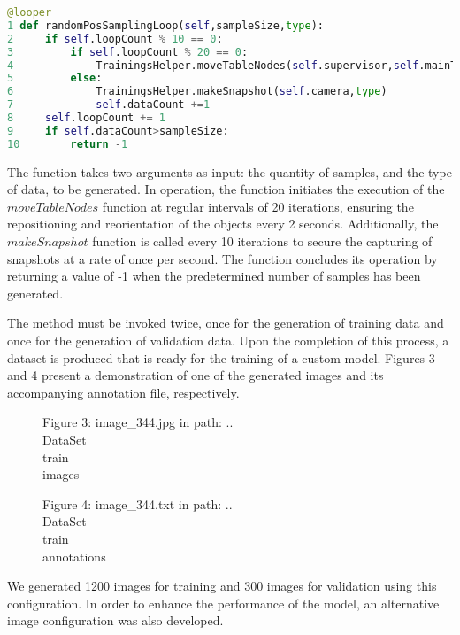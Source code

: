 \begin{lstlisting}[language=python]
@looper
1 def randomPosSamplingLoop(self,sampleSize,type):
2     if self.loopCount % 10 == 0:
3         if self.loopCount % 20 == 0:
4             TrainingsHelper.moveTableNodes(self.supervisor,self.mainTable)
5         else:
6             TrainingsHelper.makeSnapshot(self.camera,type)
7             self.dataCount +=1
8     self.loopCount += 1
9     if self.dataCount>sampleSize:
10        return -1
\end{lstlisting}
The function takes two arguments as input: the quantity of samples, and the type of data, to be generated. In operation, the function initiates the execution of the \(moveTableNodes\) function at regular intervals of 20 iterations, ensuring the repositioning and reorientation of the objects every 2 seconds. Additionally, the \(makeSnapshot\) function is called every 10 iterations to secure the capturing of snapshots at a rate of once per second. The function concludes its operation by returning a value of -1 when the predetermined number of samples has been generated.

The method must be invoked twice, once for the generation of training data and once for the generation of validation data. Upon the completion of this process, a dataset is produced that is ready for the training of a custom model. Figures 3 and 4 present a demonstration of one of the generated images and its accompanying annotation file, respectively.

\begin{figure}[!htbp]
    \centering
    \caption{Figure 3: image\_344.jpg in path: ..\\DataSet\\train\\images  }
\end{figure}

\begin{figure}[!htbp]
    \centering
    \caption{Figure 4: image\_344.txt in path: ..\\DataSet\\train\\annotations  }
\end{figure}

We generated 1200 images for training and 300 images for validation using this configuration. In order to enhance the performance of the model, an alternative image configuration was also developed.

